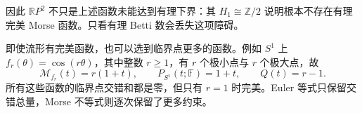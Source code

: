 因此 \(\mathbb RP^2\) 不只是上述函数未能达到有理下界：其 \(H_1\cong\mathbb Z/2\) 说明根本不存在有理完美 Morse 函数。只看有理 Betti 数会丢失这项障碍。

\ProseParagraphBreak

即使流形有完美函数，也可以选到临界点更多的函数。例如 \(S^1\) 上 \(f_r(\theta)=\cos(r\theta)\)，其中整数 \(r\ge1\)，有 \(r\) 个极小点与 \(r\) 个极大点，故
\[
	\mathcal M_{f_r}(t)=r(1+t),\qquad
	P_{S^1}(t;\mathbb F)=1+t,\qquad Q(t)=r-1.
\]
所有这些函数的临界点交错和都是零，但只有 \(r=1\) 时完美。Euler 等式只保留交错总量，Morse 不等式则逐次保留了更多约束。
